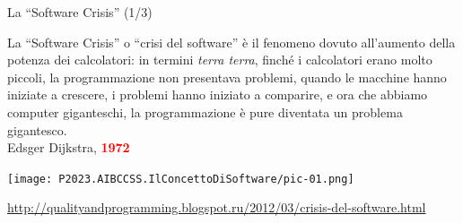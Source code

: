 \documentclass{beamer}
\begin{document}
\begin{frame}{\centerline{La ``Software Crisis'' (1/3)}}

La ``Software Crisis'' o ``crisi del software'' \`{e} il fenomeno dovuto all'aumento della potenza dei calcolatori: in termini \textit{terra terra}, finch\'{e} i calcolatori erano molto piccoli, la programmazione non presentava problemi, quando le macchine hanno iniziate a crescere, i problemi hanno iniziato a comparire, e ora che abbiamo computer giganteschi, la programmazione è pure diventata un problema gigantesco.\\
Edsger Dijkstra, \textcolor{red}{\bf 1972}
\begin{center}
\texttt{[image: P2023.AIBCCSS.IlConcettoDiSoftware/pic-01.png]}
\end{center}



\begin{center}
\tiny
\url{http://qualityandprogramming.blogspot.ru/2012/03/crisis-del-software.html}
\end{center}

\end{frame}
\end{document}
